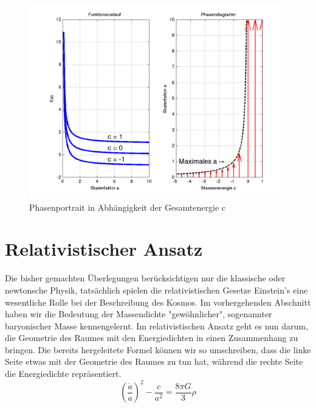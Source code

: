 \begin{refsection}
\begin{enumerate}
\end{enumerate}

\begin{figure}[h]
	\centering
	\includegraphics[width  = \textwidth]{friedmann/images/phasendiagramm.png}
	\caption{Phasenportrait in Abhängigkeit der Gesamtenergie c
		\label{friedmann:phasenportrait}}
\end{figure}%

%
	
\section{Relativistischer Ansatz}
Die bisher gemachten Überlegungen berücksichtigen nur die klassische oder newtonsche Physik, tatsächlich spielen die relativistischen Gesetze Einstein's eine wesentliche Rolle bei der Beschreibung des Kosmos.
Im vorhergehenden Abschnitt haben wir die Bedeutung der Massendichte "gewöhnlicher", sogenannter baryonischer Masse kennengelernt. Im relativistischen Ansatz geht es nun darum, die Geometrie des Raumes mit den Energiedichten in einen Zusammenhang zu bringen.
Die bereits hergeleitete Formel können wir so umschreiben, dass die linke Seite etwas mit der Geometrie des Raumes zu tun hat, während die rechte Seite die Energiedichte repräsentiert.
\begin{equation}
\left(\frac{\dot{a}}{a} \right)^2 - \frac{c}{a^2} = \frac{8 \pi G}{3} \rho 
\label{friedmann:Einstein}
\end{equation}


\end{refsection}
